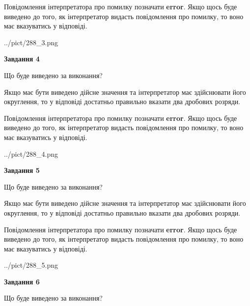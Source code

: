 \documentclass[12pt, ukrainian]{article}
\begin{document}
{\begin {Large}
Повідомлення інтерпретатора про помилку позначати \textbf{error}.
Якщо щось буде виведено до того, як інтерпретатор видасть повідомлення про помилку, 
то воно має вказуватись у відповіді. \par

\begin{center}
	{../pict/288_3.png}
\end{center}
\newpage

{\begin {center}\textbf{Завдання 4}\end {center}}\par
Що буде виведено за виконання? \par

Якщо має бути виведено дійсне значення та інтерпретатор має здійснювати його округлення, 
то у відповіді достатньо правильно вказати два дробових розряди.

Повідомлення інтерпретатора про помилку позначати \textbf{error}.
Якщо щось буде виведено до того, як інтерпретатор видасть повідомлення про помилку, 
то воно має вказуватись у відповіді. \par

\begin{center}
	{../pict/288_4.png}
\end{center}
\newpage

{\begin {center}\textbf{Завдання 5}\end {center}}\par
Що буде виведено за виконання? \par

Якщо має бути виведено дійсне значення та інтерпретатор має здійснювати його округлення, 
то у відповіді достатньо правильно вказати два дробових розряди.

Повідомлення інтерпретатора про помилку позначати \textbf{error}.
Якщо щось буде виведено до того, як інтерпретатор видасть повідомлення про помилку, 
то воно має вказуватись у відповіді. \par

\begin{center}
	{../pict/288_5.png}
\end{center}
\newpage

{\begin {center}\textbf{Завдання 6}\end {center}}\par
Що буде виведено за виконання? \par


\end{Large}}
\end{document}
